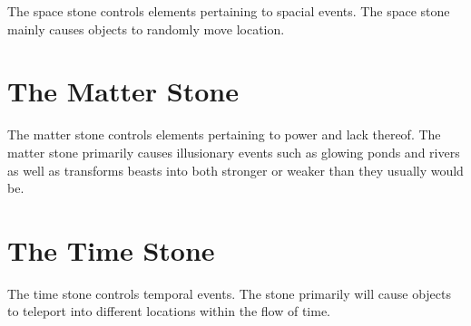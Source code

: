 The space stone controls elements pertaining to spacial events. The space stone mainly causes objects to randomly move location.


\section{The Matter Stone}

The matter stone controls elements pertaining to power and lack thereof. The matter stone primarily causes illusionary events such as glowing ponds and rivers as well as transforms beasts into both stronger or weaker than they usually would be.

\section{The Time Stone}

The time stone controls temporal events. The stone primarily will cause objects to teleport into different locations within the flow of time.